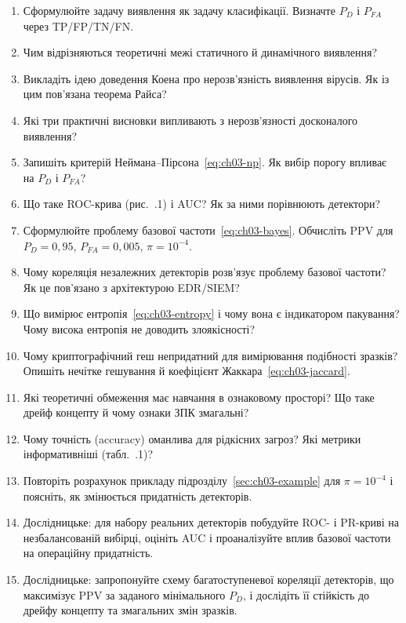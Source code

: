 \selfcheck
\begin{enumerate}
\item Сформулюйте задачу виявлення як задачу класифікації. Визначте $P_D$ і $P_{FA}$ через TP/FP/TN/FN.
\item Чим відрізняються теоретичні межі статичного й динамічного виявлення?
\item Викладіть ідею доведення Коена про нерозв'язність виявлення вірусів. Як із цим пов'язана теорема Райса?
\item Які три практичні висновки випливають з нерозв'язності досконалого виявлення?
\item Запишіть критерій Неймана--Пірсона~\eqref{eq:ch03-np}. Як вибір порогу впливає на $P_D$ і $P_{FA}$?
\item Що таке ROC-крива (рис.~\thechapter.1) і AUC? Як за ними порівнюють детектори?
\item Сформулюйте проблему базової частоти~\eqref{eq:ch03-bayes}. Обчисліть PPV для $P_D=0{,}95$, $P_{FA}=0{,}005$, $\pi=10^{-4}$.
\item Чому кореляція незалежних детекторів розв'язує проблему базової частоти? Як це пов'язано з архітектурою EDR/SIEM?
\item Що вимірює ентропія~\eqref{eq:ch03-entropy} і чому вона є індикатором пакування? Чому висока ентропія не доводить злоякісності?
\item Чому криптографічний геш непридатний для вимірювання подібності зразків? Опишіть нечітке гешування й коефіцієнт Жаккара~\eqref{eq:ch03-jaccard}.
\item Які теоретичні обмеження має навчання в ознаковому просторі? Що таке дрейф концепту й чому ознаки ЗПК змагальні?
\item Чому точність (accuracy) оманлива для рідкісних загроз? Які метрики інформативніші (табл.~\thechapter.1)?
\item Повторіть розрахунок прикладу підрозділу~\ref{sec:ch03-example} для $\pi = 10^{-4}$ і поясніть, як змінюється придатність детекторів.
\item Дослідницьке: для набору реальних детекторів побудуйте ROC- і PR-криві на незбалансованій вибірці, оцініть AUC і проаналізуйте вплив базової частоти на операційну придатність.
\item Дослідницьке: запропонуйте схему багатоступеневої кореляції детекторів, що максимізує PPV за заданого мінімального $P_D$, і дослідіть її стійкість до дрейфу концепту та змагальних змін зразків.
\end{enumerate}
